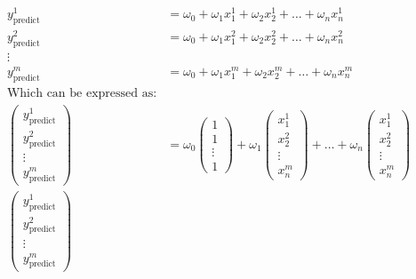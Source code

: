 \documentclass[12pt letter]{report}
\begin{document}
\begin{align*}
  y^1_{\text{predict}}                                                                                         & = \omega_0 + \omega_1x^1_1 + \omega_2x^1_2 + \ldots + \omega_nx^1_n \\
  y^2_{\text{predict}}                                                                                         & = \omega_0 + \omega_1x^2_1 + \omega_2x^2_2 + \ldots + \omega_nx^2_n \\
  \vdots                                                                                                                                                                             \\
  y^m_{\text{predict}}                                                                                         & = \omega_0 + \omega_1x^m_1 + \omega_2x^m_2 + \ldots + \omega_nx^m_n \\
  \text{Which can be expressed as:}                                                                                                                                                  \\
  \begin{pmatrix} y^1_{\text{predict}} \\ y^2_{\text{predict}}\\ \vdots \\  y^m_{\text{predict}} \end{pmatrix} & = \omega_0
  \begin{pmatrix} 1 \\ 1\\ \vdots\\ 1 \end{pmatrix} + \omega_1 \begin{pmatrix} x^1_1 \\ x^2_2 \\  \vdots\\ x^m_n
                                                               \end{pmatrix} + \ldots + \omega_n \begin{pmatrix} x^1_1\\ x^2_2 \\  \vdots\\ x^m_n \end{pmatrix}                      \\
  \begin{pmatrix} y^1_{\text{predict}} \\
    y^2_{\text{predict}} \\ \vdots \\  y^m_{\text{predict}}

\end{pmatrix}
\end{align*}
\end{document}
